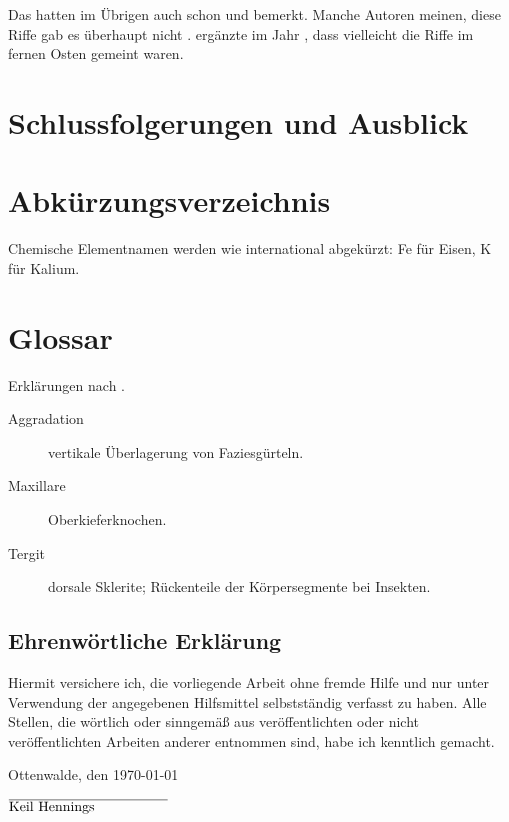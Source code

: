 \documentclass[a4paper,DIV=calc,11pt,%
BCOR=3mm,twoside,headsepline,%
openright,%
numbers=noenddot,%
bibliography=totoc%
]{scrreprt}
\begin{document}
Das hatten im Übrigen auch schon \citet{Alvin1967} und \citet{Till36} bemerkt. Manche Autoren meinen, diese Riffe gab es überhaupt nicht \citep{Ash1997}. \citeauthor{Augusta1960} ergänzte im Jahr \citeyear{Augusta1960}, dass vielleicht die Riffe im fernen Osten gemeint waren.

\chapter{Schlussfolgerungen und Ausblick}

\blindtext




\appendix

\chapter{Abkürzungsverzeichnis}

Chemische Elementnamen werden wie international abgekürzt: Fe für Eisen, K für Kalium.

\chapter{Glossar}
Erklärungen nach \citet{Arno1991}.

\begin{description}
	\item[Aggradation] vertikale Überlagerung von Faziesgürteln.
	\item[Maxillare] Oberkieferknochen.
	\item[Tergit] dorsale Sklerite; Rückenteile der Körpersegmente bei Insekten.
\end{description}

\newpage
\section*{Ehrenwörtliche Erklärung}

Hiermit versichere ich, die vorliegende Arbeit ohne fremde Hilfe und nur unter Verwendung der angegebenen Hilfsmittel selbstständig verfasst zu haben. Alle Stellen, die wörtlich oder sinngemäß aus veröffentlichten oder nicht veröffentlichten Arbeiten anderer entnommen sind, habe ich kenntlich gemacht.\bigskip

\noindent
Ottenwalde, den \today

\vspace*{2cm}
\noindent
$\overline{\parbox{4cm}{Keil Hennings}}$
\end{document}
